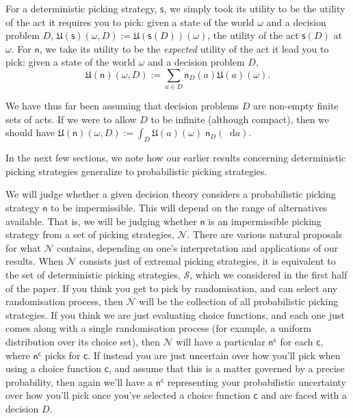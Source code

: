 \documentclass[a4paper]{article}
\newcommand\Exp{\mathsf{Exp}}
\newcommand\EU{\mathrm{EU}}
\newcommand\U{\mathfrak{U}} %
\renewcommand\S{\mathcal{S}}
\newcommand\s{\mathsf{s}}
\renewcommand\c{\mathsf{c}} %
\newcommand{\n}{\mathsf{n}}
\newcommand\Nu{\mathcal{N}}
\newcommand{\todoold}[2][]{\todo[backgroundcolor=white,bordercolor=orange!10,linecolor=gray!10, #1,caption={},textcolor=gray]{Pre-rev: #2}}
\newcommand{\todooldinfo}[2][]{\todoold[#1]{#2}}
\renewcommand{\color}[1]{}
\newenvironment{colored}[1]{\leavevmode\color{#1}}{}
\newcommand*\diff{\mathop{}\!\mathrm{d}}
\newenvironment{CCM rewritten}
{\begingroup\color{blue}} %
{\endgroup}              %
\begin{document}
For a deterministic picking strategy, $\s$, we simply took its utility to be the utility of the act it requires you to pick: given a state of the world $\omega$ and a decision problem $D$, $\U(\s)(\omega,D):=\U(\s(D))(\omega)$, the utility of the act $\s(D)$ at $\omega$. For $\n$, we take its utility to be the \emph{expected} utility of the act it lead you to pick: given a state of the world $\omega$ and a decision problem $D$, $$\U(\n)(\omega,D):=\sum_{a \in D} \n_D(a)\U(a)(\omega).$$
\begin{comment}
\begin{colored}{violet}
	If we are allowing $D$ to be infinite (although compact), we should in fact take an integral, $\U(\n)(\omega,D):=\int_{a \in D} \U(a)(\omega)\,\n_D(\diff a).$\todoold{should we explicitly talk about finitely additive integrals?}
\end{colored}
\end{comment}


We have thus far been assuming that decision problems $D$ are non-empty finite sets of acts. If we were to allow $D$ to be infinite (although compact), then we should have $\U(\n)(\omega,D):=\int_{D} \U(a)(\omega)\; \n_D(\diff a)$.

In the next few sections, we note how our earlier results concerning deterministic
picking strategies generalize to probabilistic picking strategies.

We will judge whether a given decision theory considers a probabilistic picking strategy $\n$ to be impermissible. This will depend on the range of alternatives available. That is, we will be judging whether $\n$ is an impermissible picking strategy from a set of picking strategies, $\Nu$. 
There are various natural proposals for what $\Nu$ contains, depending on one's interpretation and applications of our results. 
When $\Nu$ consists just of extremal picking strategies, it is equivalent to the set of deterministic picking strategies, $\S$, which we considered in the first half of the paper. 
If you think you get to pick by randomisation, and can select any randomisation process, then $\Nu$ will be the collection of all probabilistic picking strategies.
If you think we are just evaluating choice functions, and each one just comes along with a single randomisation process (for example, a uniform distribution over its choice set), %
then $\Nu$ will have a particular $\n^\c$ for each $\c$, where $\n^\c$ picks for $\c$. 
If  instead you are just uncertain over how you'll pick when using a choice function $\c$, and assume that this is a matter governed by a precise probability, then again we'll have a $\n^\c$ representing your probabilistic uncertainty over how you'll pick once you've selected a choice function $\c$ and are faced with a decision $D$.
\end{document}
